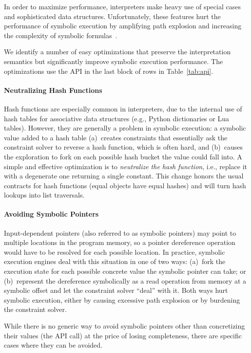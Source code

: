 In order to maximize performance, interpreters make heavy use of special cases and sophisticated data structures.  Unfortunately, these features hurt the performance of symbolic execution by amplifying path explosion and increasing the complexity of symbolic formulas~\cite{overify}.

We identify a number of easy optimizations that preserve the interpretation semantics but significantly improve symbolic execution performance.  The optimizations use the \chef API in the last block of rows in Table~\ref{tab:api}.

\paragraph{Neutralizing Hash Functions}

Hash functions are especially common in interpreters, due to the internal use of hash tables for associative data structures (e.g., Python dictionaries or Lua tables).  However, they are generally a problem in symbolic execution: a symbolic value added to a hash table (a)~creates constraints that essentially ask the constraint solver to reverse a hash function, which is often hard, and (b)~causes the exploration to fork on each possible hash bucket the value could fall into.
%
A simple and effective optimization is to \emph{neutralize the hash function}, i.e., replace it with a degenerate one returning a single constant. This change honors the usual contracts for hash functions (equal objects have equal hashes) and will turn hash lookups into list traversals.

\paragraph{Avoiding Symbolic Pointers}

Input-dependent pointers (also referred to as symbolic pointers) may point to multiple locations in the program memory, so a pointer dereference operation would have to be resolved for each possible location.  In practice, symbolic execution engines deal with this situation in one of two ways:
%
(a)~fork the execution state for each possible concrete value the symbolic pointer can take; or
%
(b)~represent the dereference symbolically as a read operation from memory at a symbolic offset and let the constraint solver ``deal'' with it.
%
Both ways hurt symbolic execution, either by causing excessive path explosion or by burdening the constraint solver.

While there is no generic way to avoid symbolic pointers other than concretizing their values (the  API call) at the price of losing completeness, there are specific cases where they can be avoided.

